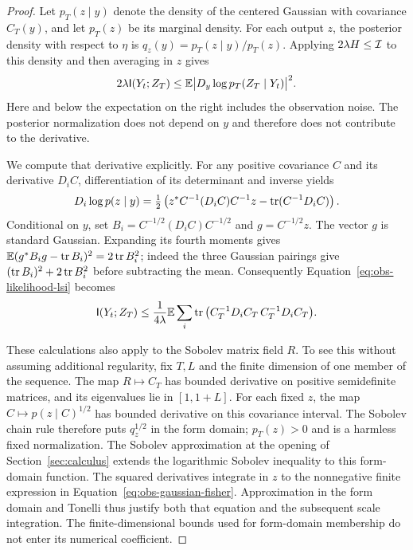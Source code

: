 \begin{proof}
Let $p_T(z\mid y)$ denote the density of the centered Gaussian with
covariance $C_T(y)$, and let $p_T(z)$ be its marginal density.
For each output $z$, the posterior density with respect to $\eta$ is
$q_z(y)=p_T(z\mid y)/p_T(z)$.  Applying $2\lambda H\le\mathcal I$ to
this density and then averaging in $z$ gives
\begin{equation}\label{eq:obs-likelihood-lsi}
 2\lambda\mathsf I(Y_t;Z_T)
 \le\mathbb E\big|D_y\log p_T(Z_T\mid Y_t)\big|^2.
\end{equation}
Here and below the expectation on the right includes the observation
noise.  The posterior normalization does not depend on $y$ and therefore
does not contribute to the derivative.

We compute that derivative explicitly.  For any positive covariance
$C$ and its derivative $D_iC$, differentiation of its determinant and
inverse yields
\[
 D_i\log p(z\mid y)
 =\tfrac12\left(
 z^*C^{-1}(D_iC)C^{-1}z-\operatorname{tr}(C^{-1}D_iC)\right).
\]
Conditional on $y$, set $B_i=C^{-1/2}(D_iC)C^{-1/2}$ and
$g=C^{-1/2}z$.  The vector $g$ is standard Gaussian.  Expanding its
fourth moments gives
$\mathbb E(g^*B_ig-\operatorname{tr} B_i)^2=2\operatorname{tr} B_i^2$; indeed the three Gaussian
pairings give $(\operatorname{tr} B_i)^2+2\operatorname{tr} B_i^2$ before subtracting the mean.
Consequently Equation~\eqref{eq:obs-likelihood-lsi} becomes
\begin{equation}\label{eq:obs-gaussian-fisher}
 \mathsf I(Y_t;Z_T)\le\frac1{4\lambda}
 \mathbb E\sum_i\operatorname{tr}\big(C_T^{-1}D_iC_T\,C_T^{-1}D_iC_T\big).
\end{equation}

These calculations also apply to the Sobolev matrix field $R$.  To see
this without assuming additional regularity, fix $T,L$ and the finite
dimension of one member of the sequence.  The map
$R\mapsto C_T$ has bounded derivative on positive semidefinite
matrices, and its eigenvalues lie in $[1,1+L]$.  For each fixed $z$,
the map $C\mapsto p(z\mid C)^{1/2}$ has bounded derivative on this
covariance interval.  The Sobolev chain rule therefore puts
$q_z^{1/2}$ in the form domain; $p_T(z)>0$ and is a harmless fixed
normalization.  The Sobolev approximation at the opening of
Section~\ref{sec:calculus} extends the logarithmic Sobolev inequality
to this form-domain function.  The squared derivatives
integrate in $z$ to the nonnegative finite expression in
Equation~\eqref{eq:obs-gaussian-fisher}.  Approximation in the form
domain and Tonelli thus justify both that equation and the subsequent
scale integration.  The finite-dimensional bounds used for form-domain
membership do not enter its numerical coefficient.


\end{proof}
